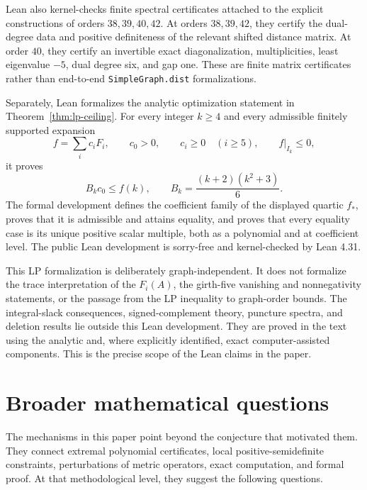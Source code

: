 \documentclass[a4paper,10pt,reqno]{amsart}
\theoremstyle{plain}
\theoremstyle{definition}
\theoremstyle{remark}
\begin{document}
Lean also kernel-checks finite spectral certificates attached to the explicit
constructions of orders \(38,39,40,42\).  At orders \(38,39,42\), they
certify the dual-degree data and positive definiteness of the relevant shifted
distance matrix.  At order \(40\), they certify an invertible exact
diagonalization, multiplicities, least eigenvalue \(-5\), dual degree six,
and gap one.  These are finite matrix certificates rather than end-to-end
\texttt{SimpleGraph.dist} formalizations.

Separately, Lean formalizes the analytic optimization statement in
Theorem~\ref{thm:lp-ceiling}.  For every integer \(k\ge4\) and every admissible
finitely supported expansion
\[
  f=\sum_i c_iF_i,
  \qquad c_0>0,
  \qquad c_i\ge0\quad(i\ge5),
  \qquad f\vert_{I_k}\le0,
\]
it proves
\[
  B_kc_0\le f(k),
  \qquad B_k=\frac{(k+2)(k^2+3)}6.
\]
The formal development defines the coefficient family of the displayed
quartic \(f_*\), proves that it is admissible and attains equality, and proves
that every equality case is its unique positive scalar multiple, both as a
polynomial and at coefficient level.  The public Lean development is
sorry-free and kernel-checked by Lean 4.31.

This LP formalization is deliberately graph-independent.  It does not
formalize the trace interpretation of the \(F_i(A)\), the girth-five
vanishing and nonnegativity statements, or the passage from the LP inequality
to graph-order bounds.  The integral-slack consequences, signed-complement
theory, puncture spectra, and deletion results lie outside this Lean
development.  They are proved in the text using the analytic and, where
explicitly identified, exact computer-assisted components.  This is the
precise scope of the Lean claims in the paper.

\section{Broader mathematical questions}\label{sec:scope}

The mechanisms in this paper point beyond the conjecture that motivated them.
They connect extremal polynomial certificates, local positive-semidefinite
constraints, perturbations of metric operators, exact computation, and formal
proof.  At that methodological level, they suggest the following questions.
\end{document}
